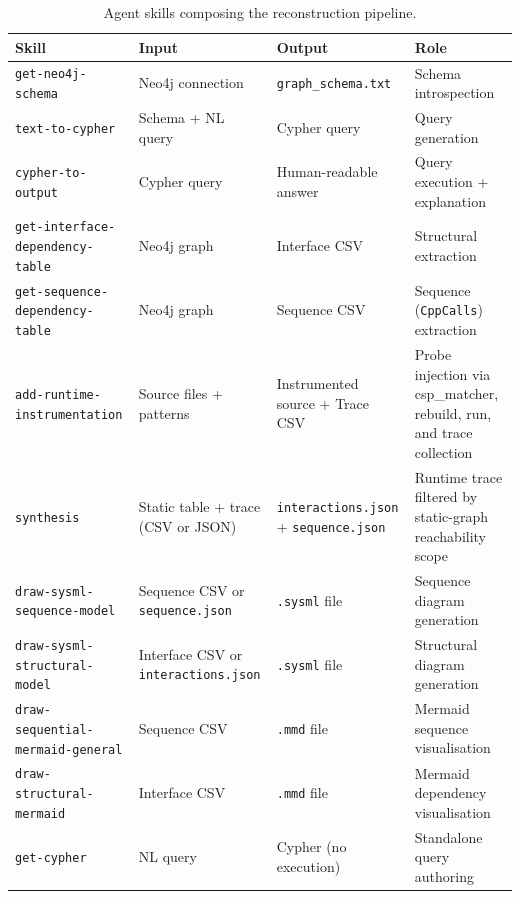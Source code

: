 \begin{table}[htb]
\centering
\caption{Agent skills composing the reconstruction pipeline.}
\label{tab:skills}
\small
{\renewcommand{\arraystretch}{1.6}
\begin{tabularx}{\textwidth}{@{} >{\ttfamily}p{} p{} p{} >{\raggedright\arraybackslash}X @{}}
\toprule
\textbf{Skill} & \textbf{Input} & \textbf{Output} & \textbf{Role} \\
\midrule
\texttt{get-neo4j-schema}
  & Neo4j connection
  & \texttt{graph\_schema.txt}
  & Schema introspection \\
\texttt{text-to-cypher}
  & Schema + NL query
  & Cypher query
  & Query generation \\
\texttt{cypher-to-output}
  & Cypher query
  & Human-readable answer
  & Query execution + explanation \\
\texttt{get-interface-dependency-table}
  & Neo4j graph
  & Interface CSV
  & Structural extraction \\
\texttt{get-sequence-dependency-table}
  & Neo4j graph
  & Sequence CSV
  & Sequence (\texttt{CppCalls}) extraction \\
\texttt{add-runtime-instrumentation}
  & Source files + patterns
  & Instrumented source + Trace CSV
  & Probe injection via csp\_matcher, rebuild, run, and trace collection \\
\texttt{synthesis}
  & Static table + trace (CSV or JSON)
  & \texttt{interactions.json} + \texttt{sequence.json}
  & Runtime trace filtered by static-graph reachability scope \\
\texttt{draw-sysml-sequence-model}
  & Sequence CSV or \texttt{sequence.json}
  & \texttt{.sysml} file
  & Sequence diagram generation \\
\texttt{draw-sysml-structural-model}
  & Interface CSV or \texttt{interactions.json}
  & \texttt{.sysml} file
  & Structural diagram generation \\
\texttt{draw-sequential-mermaid-general}
  & Sequence CSV
  & \texttt{.mmd} file
  & Mermaid sequence visualisation \\
\texttt{draw-structural-mermaid}
  & Interface CSV
  & \texttt{.mmd} file
  & Mermaid dependency visualisation \\
\texttt{get-cypher}
  & NL query
  & Cypher (no execution)
  & Standalone query authoring \\
\bottomrule
\end{tabularx}}
\end{table}

